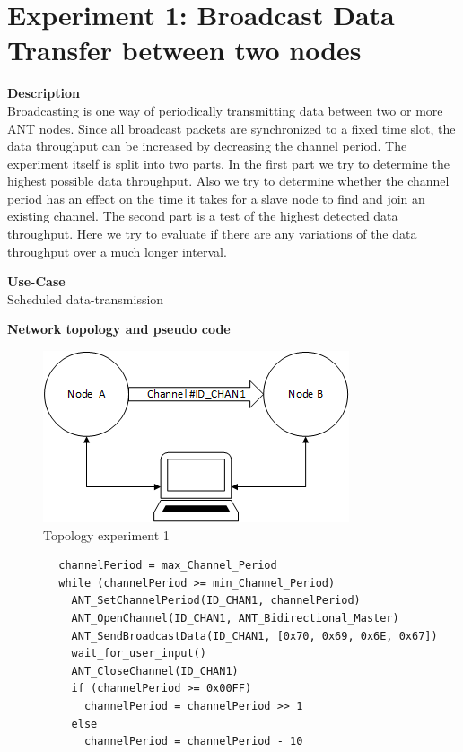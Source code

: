 \section{Experiment 1: Broadcast Data Transfer between two nodes}
\begin{description} 
	\item{\textbf{Description}} \hfill \\ Broadcasting is one way of periodically transmitting data between two or more ANT nodes. Since all broadcast packets are synchronized to a fixed time slot, the data throughput can be increased by decreasing the channel period. The experiment itself is split into two parts. In the first part we try to determine the highest possible data throughput. Also we try to determine whether the channel period has an effect on the time it takes for a slave node to find and join an existing channel. The second part is a test of the highest detected data throughput. Here we try to evaluate if there are any variations of the data throughput over a much longer interval.	
	\item{\textbf{Use-Case}} \hfill \\ Scheduled data-transmission	
	\item{\textbf{Network topology and pseudo code}} \hfill \\ 
	\begin{figure}[H]
		\centering
		\includegraphics[scale=1]{content/images/exp_topo.png}
		\caption{Topology experiment 1}
	\end{figure}
	\begin{code}[H]
		\begin{verbatim}
		channelPeriod = max_Channel_Period
		while (channelPeriod >= min_Channel_Period)
		  ANT_SetChannelPeriod(ID_CHAN1, channelPeriod)
		  ANT_OpenChannel(ID_CHAN1, ANT_Bidirectional_Master)
		  ANT_SendBroadcastData(ID_CHAN1, [0x70, 0x69, 0x6E, 0x67])
		  wait_for_user_input()
		  ANT_CloseChannel(ID_CHAN1)
		  if (channelPeriod >= 0x00FF)
		    channelPeriod = channelPeriod >> 1
		  else
		    channelPeriod = channelPeriod - 10
		\end{verbatim}
		\caption{Broadcast data single channel (Master)}\label{lst:mExp1}
	\end{code}
	

\end{description}
